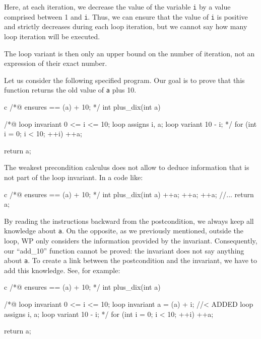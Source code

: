 \documentclass[middle]{zmdocument}
\begin{document}
Here, at each iteration, we decrease the value of the variable
\texttt{i} by a value comprised between 1 and \texttt{i}. Thus, we can
ensure that the value of \texttt{i} is positive and strictly decreases
during each loop iteration, but we cannot say how many loop iteration
will be executed.



The loop variant is then only an upper bound on the number of iteration,
not an expression of their exact number.





Let us consider the following specified program. Our goal is to prove
that this function returns the old value of \texttt{a} plus 10.



\begin{CodeBlock}{c}
/*@
    ensures \result == \old(a) + 10;
*/
int plus_dix(int a){
    /*@
        loop invariant 0 <= i <= 10;
        loop assigns i, a;
        loop variant 10 - i;
    */
    for (int i = 0; i < 10; ++i)
        ++a;

    return a;
}
\end{CodeBlock}



The weakest precondition calculus does not allow to deduce information
that is not part of the loop invariant. In a code like:



\begin{CodeBlock}{c}
/*@
    ensures \result == \old(a) + 10;
*/
int plus_dix(int a){
    ++a;
    ++a;
    ++a;
    //...
    return a;
}
\end{CodeBlock}


By reading the instructions backward
from the postcondition, we always keep all knowledge about \texttt{a}. On
the opposite, as we previously mentioned, outside the loop, WP only
considers the information provided by the invariant. Consequently, our
``add\_10'' function cannot be proved: the invariant does not say anything
about \texttt{a}. To create a link between the postcondition and the
invariant, we have to add this knowledge. See, for example:



\begin{CodeBlock}{c}
/*@
    ensures \result == \old(a) + 10;
*/
int plus_dix(int a){
    /*@
        loop invariant 0 <= i <= 10;
        loop invariant a = \old(a) + i; //< ADDED
        loop assigns i, a;
        loop variant 10 - i;
    */
    for (int i = 0; i < 10; ++i)
        ++a;

    return a;
}
\end{CodeBlock}
\end{document}

